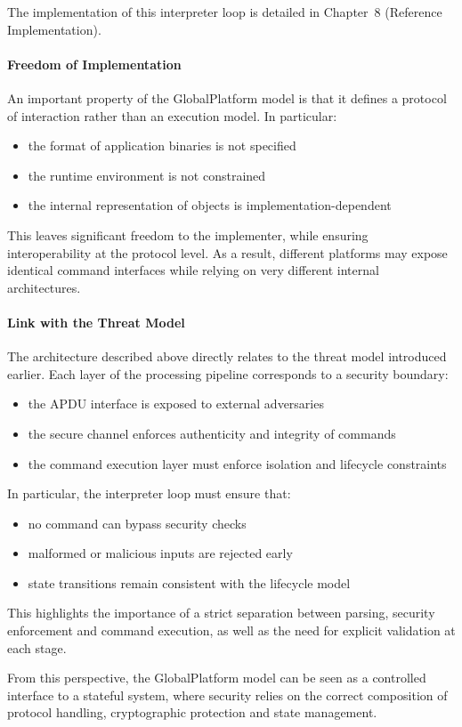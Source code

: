 The implementation of this interpreter loop is detailed in Chapter~8 (Reference
Implementation).

\paragraph{Freedom of Implementation}

An important property of the GlobalPlatform model is that it defines a protocol
of interaction rather than an execution model. In particular:

\begin{itemize}
\item the format of application binaries is not specified
\item the runtime environment is not constrained
\item the internal representation of objects is implementation-dependent
\end{itemize}

This leaves significant freedom to the implementer, while ensuring
interoperability at the protocol level. As a result, different platforms may
expose identical command interfaces while relying on very different internal
architectures.

\paragraph{Link with the Threat Model}

The architecture described above directly relates to the threat model
introduced earlier.  Each layer of the processing pipeline corresponds to a
security boundary:

\begin{itemize}
\item the APDU interface is exposed to external adversaries
\item the secure channel enforces authenticity and integrity of commands
\item the command execution layer must enforce isolation and lifecycle
    constraints
\end{itemize}

In particular, the interpreter loop must ensure that:
\begin{itemize}
\item no command can bypass security checks
\item malformed or malicious inputs are rejected early
\item state transitions remain consistent with the lifecycle model
\end{itemize}

This highlights the importance of a strict separation between parsing, security
enforcement and command execution, as well as the need for explicit validation
at each stage.

From this perspective, the GlobalPlatform model can be seen as a controlled
interface to a stateful system, where security relies on the correct
composition of protocol handling, cryptographic protection and state
management.

